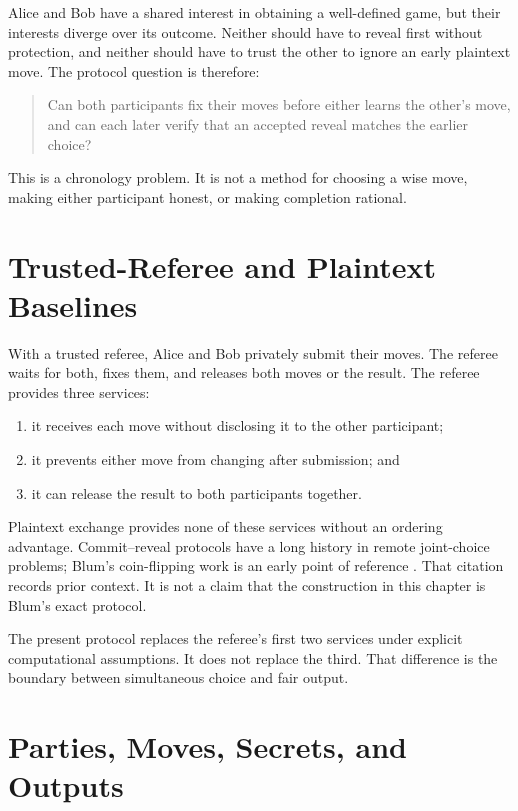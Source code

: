 Alice and Bob have a shared interest in obtaining a well-defined game, but
their interests diverge over its outcome. Neither should have to reveal first
without protection, and neither should have to trust the other to ignore an
early plaintext move. The protocol question is therefore:

\begin{quote}
Can both participants fix their moves before either learns the other's move,
and can each later verify that an accepted reveal matches the earlier choice?
\end{quote}

This is a chronology problem. It is not a method for choosing a wise move,
making either participant honest, or making completion rational.

\section{Trusted-Referee and Plaintext Baselines}

With a trusted referee, Alice and Bob privately submit their moves. The referee
waits for both, fixes them, and releases both moves or the result. The referee
provides three services:

\begin{enumerate}
    \item it receives each move without disclosing it to the other participant;
    \item it prevents either move from changing after submission; and
    \item it can release the result to both participants together.
\end{enumerate}

Plaintext exchange provides none of these services without an ordering
advantage. Commit--reveal protocols have a long history in remote joint-choice
problems; Blum's coin-flipping work is an early point of reference
\cite{blum1983coinflipping}. That citation records prior context. It is not a
claim that the construction in this chapter is Blum's exact protocol.

The present protocol replaces the referee's first two services under explicit
computational assumptions. It does not replace the third. That difference is
the boundary between simultaneous choice and fair output.

\section{Parties, Moves, Secrets, and Outputs}

